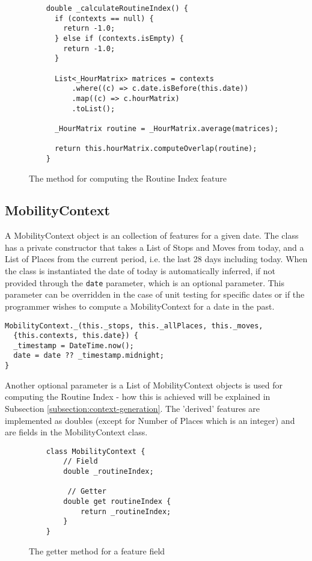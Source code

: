 \begin{figure}[h]
    \centering
    \begin{verbatim}
    double _calculateRoutineIndex() {
      if (contexts == null) {
        return -1.0;
      } else if (contexts.isEmpty) {
        return -1.0;
      }
    
      List<_HourMatrix> matrices = contexts
          .where((c) => c.date.isBefore(this.date))
          .map((c) => c.hourMatrix)
          .toList();
    
      _HourMatrix routine = _HourMatrix.average(matrices);
    
      return this.hourMatrix.computeOverlap(routine);
    }
    \end{verbatim}
    \caption{The method for computing the Routine Index feature}
    \label{fig:routine-index-code}
\end{figure}

\subsection{MobilityContext}
A MobilityContext object is an collection of features for a given date. The class has a private constructor that takes a List of Stops and Moves from today, and a List of Places from the current period, i.e. the last 28 days including today. When the class is instantiated the date of today is automatically inferred, if not provided through the \verb|date| parameter, which is an optional parameter. This parameter can be overridden in the case of unit testing for specific dates or if the programmer wishes to compute a MobilityContext for a date in the past.

\begin{verbatim}
MobilityContext._(this._stops, this._allPlaces, this._moves,
  {this.contexts, this.date}) {
  _timestamp = DateTime.now();
  date = date ?? _timestamp.midnight;
}
\end{verbatim}

Another optional parameter is a List of MobilityContext objects is used for computing the Routine Index - how this is achieved will be explained in Subsection \ref{subsection:context-generation}. The 'derived' features are implemented as doubles (except for Number of Places which is an integer) and are fields in the MobilityContext class.

\begin{figure}[h]
    \centering
    \begin{verbatim}
    class MobilityContext {
        // Field
        double _routineIndex;
     
         // Getter
        double get routineIndex {
            return _routineIndex;
        }
    }
    \end{verbatim}
    \caption{The getter method for a feature field}
    \label{fig:feature-getter}
\end{figure}

